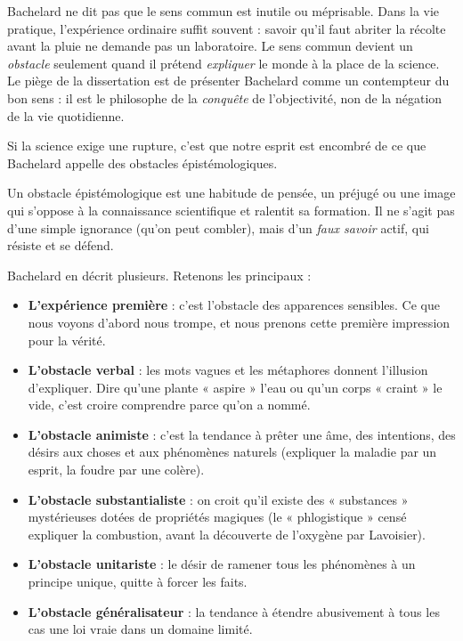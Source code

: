 \documentclass[11pt]{article}
\newcommand{\cle}[1]{{\popxbold\color{popdark}#1}}
\newcounter{popsec}
\newcounter{popsub}
\newcommand{\courssub}[1]{%
  \stepcounter{popsub}%
  \par\vspace{9pt}\noindent{\popxbold\fontsize{11.5}{13}\selectfont\color{popink}{\color{poporange}\thepopsec.\thepopsub}\hspace{6pt}#1}\par\nopagebreak\vspace{4pt}
}
\begin{document}
\begin{attention}
Bachelard ne dit pas que le sens commun est inutile ou méprisable. Dans la vie pratique, l'expérience ordinaire suffit souvent : savoir qu'il faut abriter la récolte avant la pluie ne demande pas un laboratoire. Le sens commun devient un \emph{obstacle} seulement quand il prétend \emph{expliquer} le monde à la place de la science. Le piège de la dissertation est de présenter Bachelard comme un contempteur du bon sens : il est le philosophe de la \emph{conquête} de l'objectivité, non de la négation de la vie quotidienne.
\end{attention}

\courssub{Les obstacles épistémologiques}

Si la science exige une rupture, c'est que notre esprit est encombré de ce que Bachelard appelle des \cle{obstacles épistémologiques}.

\begin{definition}
Un \cle{obstacle épistémologique} est une habitude de pensée, un préjugé ou une image qui s'oppose à la connaissance scientifique et ralentit sa formation. Il ne s'agit pas d'une simple ignorance (qu'on peut combler), mais d'un \emph{faux savoir} actif, qui résiste et se défend.
\end{definition}

Bachelard en décrit plusieurs. Retenons les principaux :

\begin{itemize}
\item \textbf{L'expérience première} : c'est l'obstacle des apparences sensibles. Ce que nous voyons d'abord nous trompe, et nous prenons cette première impression pour la vérité.
\item \textbf{L'obstacle verbal} : les mots vagues et les métaphores donnent l'illusion d'expliquer. Dire qu'une plante « aspire » l'eau ou qu'un corps « craint » le vide, c'est croire comprendre parce qu'on a nommé.
\item \textbf{L'obstacle animiste} : c'est la tendance à prêter une âme, des intentions, des désirs aux choses et aux phénomènes naturels (expliquer la maladie par un esprit, la foudre par une colère).
\item \textbf{L'obstacle substantialiste} : on croit qu'il existe des « substances » mystérieuses dotées de propriétés magiques (le « phlogistique » censé expliquer la combustion, avant la découverte de l'oxygène par Lavoisier).
\item \textbf{L'obstacle unitariste} : le désir de ramener tous les phénomènes à un principe unique, quitte à forcer les faits.
\item \textbf{L'obstacle généralisateur} : la tendance à étendre abusivement à tous les cas une loi vraie dans un domaine limité.
\end{itemize}
\end{document}

